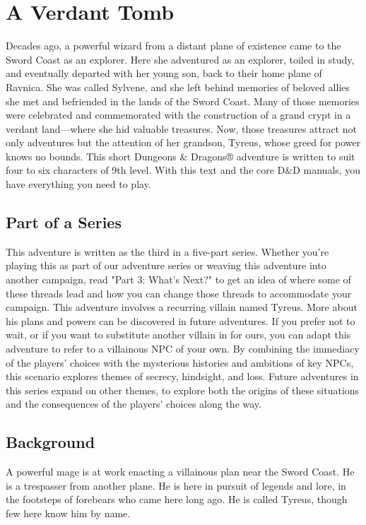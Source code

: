 \documentclass[10pt,a4paper,twoside,twocolumn,openany,bg=print,nodeprecatedcode]{dndbook}
\begin{document}
\tableofcontents
\newpage
\chapter{A Verdant Tomb}
Decades ago, a powerful wizard from a distant plane of existence came to the Sword Coast as an explorer. Here she adventured as an explorer, toiled in study, and eventually departed with her young son, back to their home plane of Ravnica. She was called Sylvene, and she left behind memories of beloved allies she met and befriended in the lands of the Sword Coast. Many of those memories were celebrated and commemorated with the construction of a grand crypt in a verdant land—where she hid valuable treasures. Now, those treasures attract not only adventures but the attention of her grandson, Tyreus, whose greed for power knows no bounds.
This short Dungeons \& Dragons® adventure is written to suit four to six characters of 9th level. With this text and the core D\&D manuals, you have everything you need to play.
\section{Part of a Series}
This adventure is written as the third in a five-part series. Whether you're playing this as part of our adventure series or weaving this adventure into another campaign, read "Part 3: What's Next?" to get an idea of where some of these threads lead and how you can change those threads to accommodate your campaign.
This adventure involves a recurring villain named Tyreus. More about his plans and powers can be discovered in future adventures. If you prefer not to wait, or if you want to substitute another villain in for ours, you can adapt this adventure to refer to a villainous NPC of your own.
By combining the immediacy of the players' choices with the mysterious histories and ambitions of key NPCs, this scenario explores themes of secrecy, hindsight, and loss. Future adventures in this series expand on other themes, to explore both the origins of these situations and the consequences of the players' choices along the way.
\section{Background}
A powerful mage is at work enacting a villainous plan near the Sword Coast. He is a trespasser from another plane. He is here in pursuit of legends and lore, in the footsteps of forebears who came here long ago. He is called Tyreus, though few here know him by name.
\end{document}
